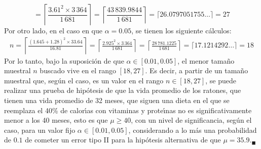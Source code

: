 \begin{solucion}
\begin{equation*}
  = \left\lceil \frac{3.61^2\times 3\,364}{1\,681} \right\rceil
  = \left\lceil \frac{43\,839.9844}{1\,681} \right\rceil
  = \lceil 26.0797051755\ldots \rceil = 27
 \end{equation*}
 Por otro lado, en el caso en que $\alpha = 0.05$, se tienen los siguiente c\'alculos:
 \begin{eqnarray*}
  n = \left\lceil \frac{(1.645 + 1.28)^2 \times 33.64}{16.81} \right\rceil
  = \left\lceil \frac{2.925^2\times 3\,364}{1\,681} \right\rceil
  = \left\lceil \frac{28\,781.1225}{1\,681} \right\rceil
  = \lceil 17.1214292\ldots \rceil = 18
 \end{eqnarray*}
 Por lo tanto, bajo la suposici\'on de que $\alpha \in [0.01,0.05]$,
 el menor tama\~no muestral $n$ buscado vive en el rango $[18,27]$.
 Es decir, a partir de un tama\~no muestral que, seg\'un el caso, es un valor en el rango $n \in [18,27]$, se puede realizar una prueba de hip\'otesis de que la vida promedio de los ratones, que tienen una vida promedio de 32 meses, que siguen una dieta en el que se reemplaza
 el 40\% de calor\'{\i}as con vitaminas y prote\'{\i}nas no es significativamente menor a los 40 meses, esto es que $\mu \geq 40$, con un nivel de significancia, seg\'un el caso, para un valor fijo $\alpha \in [0.01, 0.05]$, considerando a lo m\'as una probabilidad de $0.1$ de cometer un error tipo II para la hip\'otesis alternativa
 de que $\mu = 35.9$.${}_{\blacksquare}$
\end{solucion}
